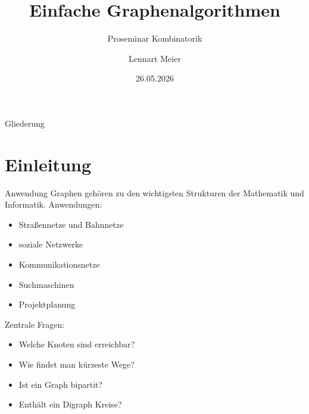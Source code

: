 \documentclass{beamer}
\title{Einfache Graphenalgorithmen}
\subtitle{Proseminar Kombinatorik}
\author{Lennart Meier}
\date{26.05.2026}
\begin{document}
\begin{frame}
\titlepage
\end{frame}
\begin{frame}{Gliederung}
\tableofcontents
\end{frame}
\section{Einleitung}
\begin{frame}{Anwendung}
Graphen gehören zu den wichtigsten Strukturen der Mathematik und Informatik.
\vspace{0.4cm}
Anwendungen:
\begin{itemize}
    \item Straßennetze und Bahnnetze
    \item soziale Netzwerke
    \item Kommunikationsnetze
    \item Suchmaschinen
    \item Projektplanung
\end{itemize}
\vspace{0.4cm}
Zentrale Fragen:
\begin{itemize}
    \item Welche Knoten sind erreichbar?
    \item Wie findet man kürzeste Wege?
    \item Ist ein Graph bipartit?
    \item Enthält ein Digraph Kreise?
\end{itemize}
\end{frame}
\end{document}
